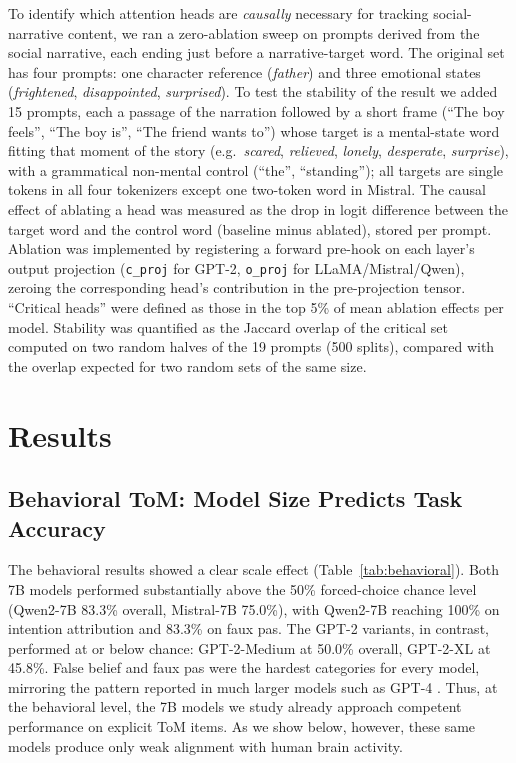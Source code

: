 \documentclass[conference]{IEEEtran}
\begin{document}
To identify which attention heads are \textit{causally} necessary for tracking social-narrative content, we ran a zero-ablation sweep on prompts derived from the social narrative, each ending just before a narrative-target word. The original set has four prompts: one character reference (\textit{father}) and three emotional states (\textit{frightened}, \textit{disappointed}, \textit{surprised}). To test the stability of the result we added 15 prompts, each a passage of the narration followed by a short frame (``The boy feels'', ``The boy is'', ``The friend wants to'') whose target is a mental-state word fitting that moment of the story (e.g.\ \textit{scared}, \textit{relieved}, \textit{lonely}, \textit{desperate}, \textit{surprise}), with a grammatical non-mental control (``the'', ``standing''); all targets are single tokens in all four tokenizers except one two-token word in Mistral. The causal effect of ablating a head was measured as the drop in logit difference between the target word and the control word (baseline minus ablated), stored per prompt. Ablation was implemented by registering a forward pre-hook on each layer's output projection (\texttt{c\_proj} for GPT-2, \texttt{o\_proj} for LLaMA/Mistral/Qwen), zeroing the corresponding head's contribution in the pre-projection tensor. ``Critical heads'' were defined as those in the top 5\% of mean ablation effects per model. Stability was quantified as the Jaccard overlap of the critical set computed on two random halves of the 19 prompts (500 splits), compared with the overlap expected for two random sets of the same size.

\section{Results}

\subsection{Behavioral ToM: Model Size Predicts Task Accuracy}
\label{sec:behavioral}

The behavioral results showed a clear scale effect (Table~\ref{tab:behavioral}). Both 7B models performed substantially above the 50\% forced-choice chance level (Qwen2-7B 83.3\% overall, Mistral-7B 75.0\%), with Qwen2-7B reaching 100\% on intention attribution and 83.3\% on faux pas. The GPT-2 variants, in contrast, performed at or below chance: GPT-2-Medium at 50.0\% overall, GPT-2-XL at 45.8\%. False belief and faux pas were the hardest categories for every model, mirroring the pattern reported in much larger models such as GPT-4 \cite{strachan2024testing}. Thus, at the behavioral level, the 7B models we study already approach competent performance on explicit ToM items. As we show below, however, these same models produce only weak alignment with human brain activity.
\end{document}
